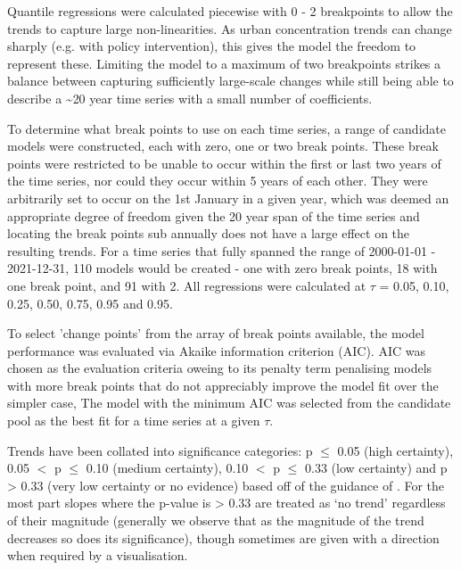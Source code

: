 \documentclass[journal abbreviation, manuscript]{copernicus}
\begin{document}
Quantile regressions were calculated piecewise with 0 - 2 breakpoints to allow the trends to capture large non-linearities. As urban concentration trends can change sharply (e.g. with policy intervention), this gives the model the freedom to represent these. Limiting the model to a maximum of two breakpoints strikes a balance between capturing sufficiently large-scale changes while still being able to describe a \textasciitilde{20} year time series with a small number of coefficients.

To determine what break points to use on each time series, a range of candidate models were constructed, each with zero, one or two break points. These break points were restricted to be unable to occur within the first or last two years of the time series, nor could they occur within 5 years of each other. They were arbitrarily set to occur on the 1st January in a given year, which was deemed an appropriate degree of freedom given the 20 year span of the time series and locating the break points sub annually does not have a large effect on the resulting trends. For a time series that fully spanned the range of 2000-01-01 - 2021-12-31, 110 models would be created - one with zero break points, 18 with one break point, and 91 with 2. All regressions were calculated at $\tau$ = 0.05, 0.10, 0.25, 0.50, 0.75, 0.95 and 0.95.

To select 'change points' from the array of break points available, the model performance was evaluated via Akaike information criterion (AIC). AIC was chosen as the evaluation criteria oweing to its penalty term penalising models with more break points that do not appreciably improve the model fit over the simpler case, The model with the minimum AIC was selected from the candidate pool as the best fit for a time series at a given $\tau$. 

Trends have been collated into significance categories: p $\le$ 0.05 (high certainty), 0.05 $<$ p $\le$ 0.10 (medium certainty), 0.10 $<$ p $\le$ 0.33 (low certainty) and p > 0.33 (very low certainty or no evidence) based off of the guidance of \cite{chang2023guidancenotebeststatistical}. For the most part slopes where the p-value is > 0.33 are treated as ‘no trend’ regardless of their magnitude (generally we observe that as the magnitude of the trend decreases so does its significance), though sometimes are given with a direction when required by a visualisation.
\end{document}
